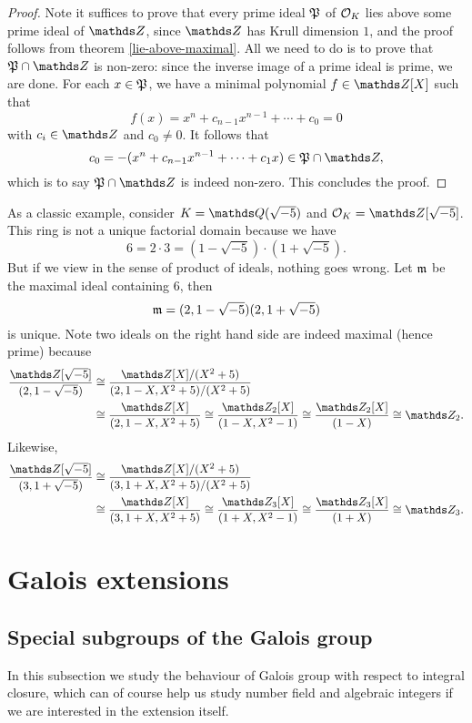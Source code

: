 			\begin{proof}
				Note it suffices to prove that every prime ideal $\mathfrak{P}$ of $\mathcal{O}_K$ lies above some prime ideal of $\Z$, since $\Z$ has Krull dimension $1$, and the proof follows from theorem \ref{lie-above-maximal}. All we need to do is to prove that $\mfk{P} \cap \Z$ is non-zero: since the inverse image of a prime ideal is prime, we are done. For each $x \in \mathfrak{P}$, we have a minimal polynomial $f \in \Z[X]$ such that
				\[
				f(x) = x^n+c_{n-1}x^{n-1}+\cdots+c_0=0
				\]
				with $c_i \in \Z$ and $c_0 \ne 0$. It follows that
				\[
				c_0=-(x^n+c_{n-1}x^{n-1}+\cdots+c_1x) \in \mfk{P} \cap \Z,
				\]
				which is to say $\mfk{P} \cap \Z$ is indeed non-zero. This concludes the proof.
			\end{proof}
			\begin{example}
				As a classic example, consider $K=\Q(\sqrt{-5})$ and $\OK = \Z[\sqrt{-5}]$. This ring is not a unique factorial domain because we have
				\[
				6 = 2 \cdot 3 = (1-\sqrt{-5}) \cdot (1+\sqrt{-5}).
				\]
				But if we view in the sense of product of ideals, nothing goes wrong. Let $\mathfrak{m}$ be the maximal ideal containing $6$, then
				\[
				\mathfrak{m} = (2,1-\sqrt{-5})(2,1+\sqrt{-5})
				\]
				is unique. Note two ideals on the right hand side are indeed maximal (hence prime) because
				\[
				\begin{aligned}
					\frac{\Z[\sqrt{-5}]}{(2,1-\sqrt{-5})} &\cong \frac{\Z[X]/(X^2+5)}{(2,1-X,X^2+5)/(X^2+5)} \\
					&\cong \frac{\Z[X]}{(2,1-X,X^2+5)} \cong \frac{\Z_2[X]}{(1-X,X^2-1)} \cong \frac{\Z_2[X]}{(1-X)} \cong \Z_2.
				\end{aligned}
				\]
				Likewise,
				\[
				\begin{aligned}
					\frac{\Z[\sqrt{-5}]}{(3,1+\sqrt{-5})} &\cong \frac{\Z[X]/(X^2+5)}{(3,1+X,X^2+5)/(X^2+5)} \\
					&\cong \frac{\Z[X]}{(3,1+X,X^2+5)} \cong \frac{\Z_3[X]}{(1+X,X^2-1)} \cong \frac{\Z_3[X]}{(1+X)} \cong \Z_3.
				\end{aligned}
				\]
			\end{example}
	\section{Galois extensions}
		\subsection{Special subgroups of the Galois group}
			In this subsection we study the behaviour of Galois group with respect to integral closure, which can of course help us study number field and algebraic integers if we are interested in the extension itself.
		
